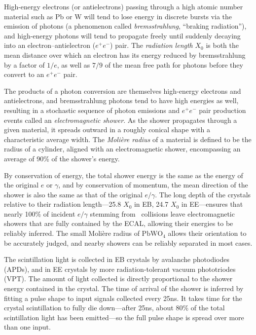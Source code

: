 High-energy electrons (or antielectrons) passing through a high atomic number material such as Pb or W will tend to lose energy in discrete
bursts via the emission of photons (a phenomenon called \textit{bremsstrahlung}, ``braking radiation''), and high-energy photons will tend to propagate freely until suddenly decaying into
an electron--antielectron ($e^{+}e^{-}$) pair. The \textit{radiation length} $X_{0}$ is both the mean distance over which an electron has its energy reduced by bremsstrahlung
by a factor of $1/e$, as well as $7/9$ of the mean free path for photons before they convert to an $e^{+}e^{-}$ pair.

The products of a photon conversion are themselves high-energy electrons and antielectrons, and bremsstrahlung photons tend to have high energies as well,
resulting in a stochastic sequence of photon emissions and $e^{+}e^{-}$ pair production events called an \textit{electromagnetic shower}. As the shower
propagates through a given material, it spreads outward in a roughly conical shape with a characteristic average width. The \textit{Molière radius} of a material
is defined to be the radius of a cylinder, aligned with an electromagnetic shower, encompassing an average of 90\% of the shower's energy.

By conservation of energy, the total shower energy is the same as the energy of the original $e$ or $\gamma$, and by conservation of momentum,
the mean direction of the shower is also the same as that of the original $e/\gamma$. The long depth of the crystals relative to their radiation
length---25.8 $X_{0}$ in EB, 24.7 $X_{0}$ in EE---ensures that nearly 100\% of incident $e/\gamma$ stemming
from \Pp\Pp\ collisions leave electromagnetic showers that are fully contained by the ECAL, allowing their energies to be reliably inferred.
The small Molière radius of $\mathrm{PbWO}_{4}$ allows their orientation to be accurately judged, and nearby showers can be reliably separated in most cases.

The scintillation light is collected in EB crystals by avalanche photodiodes (APDs), and in EE crystals by more radiation-tolerant
vacuum phototriodes (VPT). The amount of light collected is directly proportional to the shower energy contained in the crystal.
The time of arrival of the shower is inferred by fitting a pulse shape to input signals collected every 25\unit{ns}. It takes time for the
crystal scintillation to fully die down---after 25\unit{ns}, about 80\% of the total scintillation light has been emitted---so the full pulse shape
is spread over more than one input.

